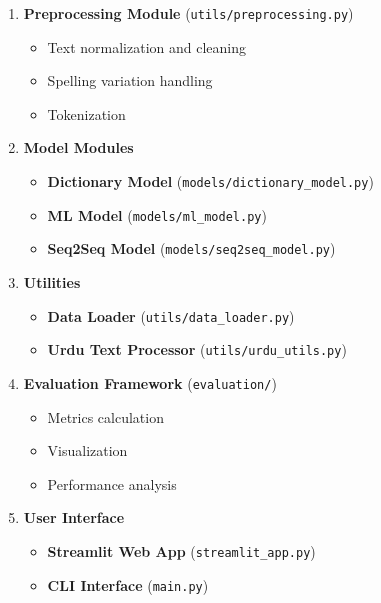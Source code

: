 \documentclass[10pt,twocolumn]{article}
\begin{document}
\begin{enumerate}[label=\arabic*.]
    \item \textbf{Preprocessing Module} (\texttt{utils/preprocessing.py})
    \begin{itemize}[leftmargin=*,noitemsep,topsep=0pt,parsep=0pt,partopsep=0pt]
        \item Text normalization and cleaning
        \item Spelling variation handling
        \item Tokenization
    \end{itemize}

    \item \textbf{Model Modules}
    \begin{itemize}[leftmargin=*,noitemsep,topsep=0pt,parsep=0pt,partopsep=0pt]
        \item \textbf{Dictionary Model} (\texttt{models/dictionary_model.py})
        \item \textbf{ML Model} (\texttt{models/ml_model.py})
        \item \textbf{Seq2Seq Model} (\texttt{models/seq2seq_model.py})
    \end{itemize}

    \item \textbf{Utilities}
    \begin{itemize}[leftmargin=*,noitemsep,topsep=0pt,parsep=0pt,partopsep=0pt]
        \item \textbf{Data Loader} (\texttt{utils/data_loader.py})
        \item \textbf{Urdu Text Processor} (\texttt{utils/urdu_utils.py})
    \end{itemize}

    \item \textbf{Evaluation Framework} (\texttt{evaluation/})
    \begin{itemize}[leftmargin=*,noitemsep,topsep=0pt,parsep=0pt,partopsep=0pt]
        \item Metrics calculation
        \item Visualization
        \item Performance analysis
    \end{itemize}

    \item \textbf{User Interface}
    \begin{itemize}[leftmargin=*,noitemsep,topsep=0pt,parsep=0pt,partopsep=0pt]
        \item \textbf{Streamlit Web App} (\texttt{streamlit_app.py})
        \item \textbf{CLI Interface} (\texttt{main.py})
    \end{itemize}
\end{enumerate}
\end{document}
